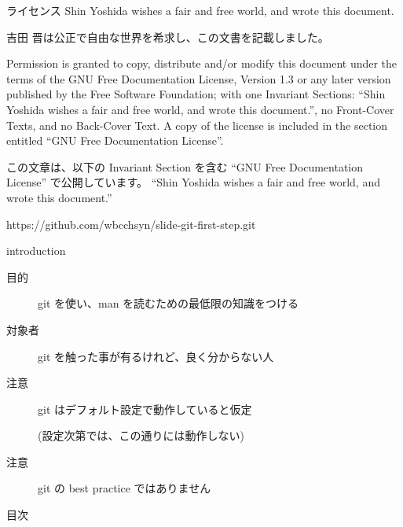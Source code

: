 
\begin{frame}{}{}
  \titlepage
\end{frame}

\begin{frame}{ライセンス}{}
Shin Yoshida wishes a fair and free world, and wrote this document.

\vspace{2ex}

吉田 晋は公正で自由な世界を希求し、この文書を記載しました。

\vspace{2ex}

{\tiny
Permission is granted to copy, distribute and/or modify this
document under the terms of the GNU Free Documentation License,
Version 1.3 or any later version published by the Free Software
Foundation; with one Invariant Sections: ``Shin Yoshida wishes
a fair and free world, and wrote this document.'',
no Front-Cover Texts, and no Back-Cover Text. A copy of the license is
included in the section entitled ``GNU Free Documentation License''.

\vspace{2ex}

この文章は、以下の Invariant Section を含む ``GNU Free Documentation License''
で公開しています。
``Shin Yoshida wishes a fair and free world, and wrote this document.''

\vspace{2ex}

https://github.com/wbcchsyn/slide-git-first-step.git
}
\end{frame}

\begin{frame}{introduction}{}

  \begin{description}

  \item[目的] git を使い、man を読むための最低限の知識をつける
  \item[対象者] git を触った事が有るけれど、良く分からない人
  \item[注意] git はデフォルト設定で動作していると仮定

    (設定次第では、この通りには動作しない)
  \item[注意] \alert{git の best practice ではありません}

  \end{description}

\end{frame}

\begin{frame}{目次}{}
  \tableofcontents
\end{frame}

